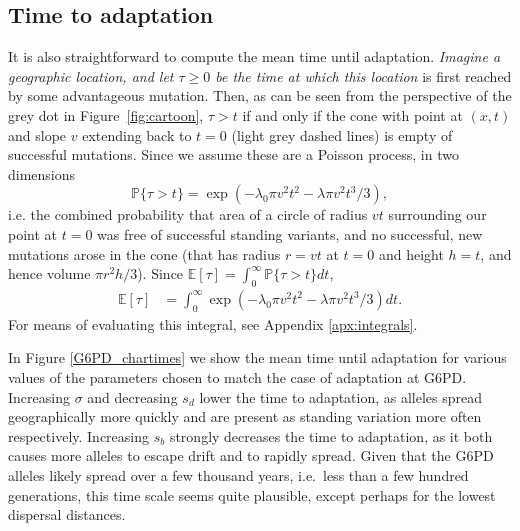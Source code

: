 \documentclass{article}
\newcommand{\gc}[1]{{\it\color{blue} #1} }
\renewcommand{\P}{\mathbb{P}}
\newcommand{\E}{\mathbb{E}}
\begin{document}

\subsection{Time to adaptation}

It is also straightforward to compute the mean time until adaptation.
\gc{Imagine a geographic location, and let $\tau \ge 0$ be the time at
which this location} is first reached by some advantageous mutation.
Then, as can be seen from the
perspective of the grey dot in Figure~\ref{fig:cartoon}, 
$\tau > t$ if and only if the cone with point at $(x,t)$ and slope $v$
extending back to $t=0$ (light grey dashed lines) is empty of successful mutations.
Since we assume these are a Poisson process, 
in two dimensions
\begin{equation} \label{eqn-no-mut-t}
    \P\{ \tau > t \} = \exp\left( - \lambda_0 \pi v^2 t^2 - \lambda \pi v^2 t^3 / 3 \right) ,
\end{equation}
i.e. the combined probability that area of a circle of radius $vt$ surrounding our
point at $t=0$ was free of successful standing variants, and no
successful, new mutations arose in the cone (that has radius $r=vt$ at
$t=0$ and height $h=t$, and hence volume $\pi r^2 h/3$). 
Since $\E[\tau] = \int_0^\infty \P\{ \tau > t \} dt$,
\begin{align}
    \E[\tau] %
        &= \int_0^\infty \exp\left( - \lambda_0 \pi v^2 t^2 - \lambda \pi v^2 t^3 / 3 \right) dt.
\end{align}
For means of evaluating this integral, see Appendix \ref{apx:integrals}.


In Figure \ref{G6PD_chartimes} we show the mean time until adaptation
for various values of the parameters chosen to match the case of
adaptation at G6PD. Increasing $\sigma$ and decreasing $s_d$ lower 
the time to adaptation, as alleles spread geographically more quickly
and are present as standing variation more often
respectively. Increasing $s_b$ strongly decreases the time to
adaptation, as it both causes more alleles to escape drift and to
rapidly spread. Given that the G6PD alleles likely spread over a few
thousand years, i.e.\ less than a few hundred generations, 
this time scale seems quite plausible, except perhaps for the lowest dispersal distances.  
\end{document}
